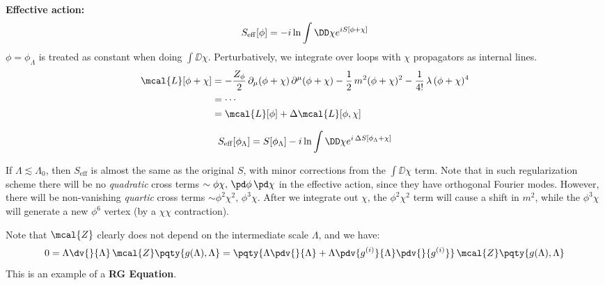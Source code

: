 \documentclass[a4paper
	,10pt
]{article}
\begin{document}
	\textbf{Effective action:}
	\begin{equation}
	  S_{\mathrm{eff}}[\phi]
	  = -i \ln \int \DD \chi
	      e^{iS[\phi + \chi]} \\
	\end{equation}
	$\phi = \phi_\Lambda$ is treated as constant when doing
	$\int \DD \chi$. Perturbatively, we integrate over loops with $\chi$ propagators as internal lines.
	\begin{equation}
	\begin{aligned}
	  \mcal{L}[\phi + \chi]
	  &= - \frac{Z_\phi}{2}\,
	      \partial_\mu (\phi + \chi)\,
	      \partial^\mu (\phi + \chi)
	    - \frac{1}{2}\, m^2
	      (\phi + \chi)^2
	    - \frac{1}{4!}\, \lambda\,
	      (\phi + \chi)^4\\
	  &= \cdots \\
	  &= \mcal{L}[\phi]
	    + \Delta\mcal{L} [\phi,\chi]
	\end{aligned}
	\end{equation}
	
	\begin{equation}
	  S_{\mathrm{eff}}[\phi_\Lambda]
	  = S[\phi_\Lambda]
	    - i \ln \int \DD \chi
	      e^{i\,\Delta S[\phi_\Lambda + \chi]} \\
	\end{equation}
	
	If $\Lambda \lesssim \Lambda_0$, then $S_{\mathrm{eff}}$ is almost
	the same as the original $S$, with minor corrections from the
	$\int \DD\chi$ term. Note that in such regularization scheme there will be no \textit{quadratic} cross terms $\sim \phi\chi,\, \pd\phi\,\pd\chi$ in the effective action, since they have orthogonal Fourier modes. However, there will be non-vanishing \textit{quartic} cross terms $\sim \phi^2\chi^2,\, \phi^3\chi$. After we integrate out $\chi$, the $\phi^2\chi^2$ term will cause a shift in $m^2$, while the $\phi^3\chi$ will generate a new $\phi^6$ vertex (by a $\chi\chi$ contraction).
	
	Note that $\mcal{Z}$ clearly does not depend on the intermediate scale $\Lambda$, and we have:
	\begin{equation}
	  0
	  = \Lambda \dv{}{\Lambda}\,
	    \mcal{Z}\pqty{g(\Lambda),\Lambda}
	  = \pqty{
	      \Lambda \pdv{}{\Lambda}
	      + \Lambda \pdv{g^{(i)}}{\Lambda}
	        \pdv{}{g^{(i)}}
	    }\,
	    \mcal{Z}\pqty{g(\Lambda),\Lambda}
	\end{equation}
	This is an example of a \textbf{RG Equation}.
\end{document}
